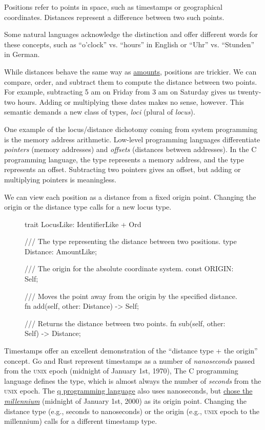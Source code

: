 \documentclass{article}
\begin{document}
Positions refer to points in space, such as timestamps or geographical coordinates.
Distances represent a difference between two such points.

Some natural languages acknowledge the distinction and offer different words for these concepts, such as ``o'clock'' vs. ``hours'' in English or ``Uhr'' vs. ``Stunden'' in German.

While distances behave the same way as \href{#amounts}{amounts}, positions are trickier.
We can compare, order, and subtract them to compute the distance between two points.
For example, subtracting 5 am on Friday from 3 am on Saturday gives us twenty-two hours.
Adding or multiplying these dates makes no sense, however.
This semantic demands a new class of types, \emph{loci} (plural of \emph{locus}).

One example of the locus/distance dichotomy coming from system programming is the memory address arithmetic.
Low-level programming languages differentiate \emph{pointers} (memory addresses) and \emph{offsets} (distances between addresses).
In the C programming language, the  type represents a memory address, and the  type represents an offset.
Subtracting two pointers gives an offset, but adding or multiplying pointers is meaningless.

We can view each position as a distance from a fixed origin point.
Changing the origin or the distance type calls for a new locus type.

\begin{figure}
\begin{code}[rust]
trait LocusLike: IdentifierLike + Ord {
  /// The type representing the distance between two positions.
  type Distance: AmountLike;

  /// The origin for the absolute coordinate system.
  const ORIGIN: Self;

  /// Moves the point away from the origin by the specified distance.
  fn add(self, other: Distance) -> Self;

  /// Returns the distance between two points.
  fn sub(self, other: Self) -> Distance;
}
\end{code}
\end{figure}

Timestamps offer an excellent demonstration of the ``distance type + the origin'' concept.
Go and Rust represent timestamps as a number of \emph{nanoseconds} passed from the \textsc{unix} epoch (midnight of January 1st, 1970),
The C programming language defines the \href{https://en.cppreference.com/w/c/chrono/time_t}{} type, which is almost always the number of \emph{seconds} from the \textsc{unix} epoch.
The \href{https://en.wikipedia.org/wiki/Q_(programming_language_from_Kx_Systems)}{q programming language} also uses nanoseconds, but \href{https://code.kx.com/q4m3/2_Basic_Data_Types_Atoms/#253-date-time-types}{chose the \emph{millennium}} (midnight of January 1st, 2000) as its origin point.
Changing the distance type (e.g., seconds to nanoseconds) or the origin (e.g., \textsc{unix} epoch to the millennium) calls for a different timestamp type.
\end{document}
